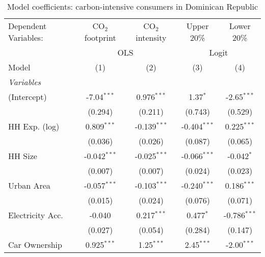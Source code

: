 
\begin{table}[htbp!]
   \centering
   \small
   \begin{adjustbox}{width = 1\textwidth, max height = 0.95\textheight, center}
      \begin{threeparttable}[b]
         \caption{\label{tab:Logit_1_DOM} Model coefficients: carbon-intensive consumers in Dominican Republic}
         \begin{tabular}{lcccc}
            \tabularnewline \midrule \midrule
            Dependent Variables: & CO$_{2}$ footprint & CO$_{2}$ intensity & Upper 20\%     & Lower 20\%\\   
             & \multicolumn{2}{c}{OLS} & \multicolumn{2}{c}{Logit} \\ 
            Model                & (1)                & (2)                & (3)            & (4)\\  
            \midrule
            \emph{Variables}\\
            (Intercept)          & -7.04$^{***}$      & 0.976$^{***}$      & 1.37$^{*}$     & -2.65$^{***}$\\   
                                 & (0.294)            & (0.211)            & (0.743)        & (0.529)\\   
            HH Exp. (log)        & 0.809$^{***}$      & -0.139$^{***}$     & -0.404$^{***}$ & 0.225$^{***}$\\   
                                 & (0.036)            & (0.026)            & (0.087)        & (0.065)\\   
            HH Size              & -0.042$^{***}$     & -0.025$^{***}$     & -0.066$^{***}$ & -0.042$^{*}$\\   
                                 & (0.007)            & (0.007)            & (0.024)        & (0.023)\\   
            Urban Area           & -0.057$^{***}$     & -0.103$^{***}$     & -0.240$^{***}$ & 0.186$^{***}$\\   
                                 & (0.015)            & (0.024)            & (0.076)        & (0.071)\\   
            Electricity Acc.     & -0.040             & 0.217$^{***}$      & 0.477$^{*}$    & -0.786$^{***}$\\   
                                 & (0.027)            & (0.054)            & (0.284)        & (0.147)\\   
            Car Ownership        & 0.925$^{***}$      & 1.25$^{***}$       & 2.45$^{***}$   & -2.00$^{***}$\\   

\end{tabular}
\end{threeparttable}
\end{adjustbox}
\end{table}

